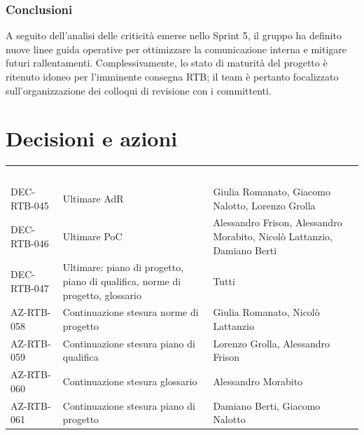 \documentclass[a4paper, 11pt]{article}
\begin{document}
\subsubsection{Conclusioni}
A seguito dell'analisi delle criticità emerse nello Sprint 5, il gruppo ha definito nuove linee guida operative per ottimizzare la comunicazione interna e mitigare futuri rallentamenti. Complessivamente, lo stato di maturità del progetto è ritenuto idoneo per l'imminente consegna RTB; il team è pertanto focalizzato sull'organizzazione dei colloqui di revisione con i committenti.

\section{Decisioni e azioni} \label{DecisioniAzioni}
\begin{center}
    \begin{tabular}{>{\centering\arraybackslash}m{3cm} >{\raggedright\arraybackslash}p{7cm} >{\centering\arraybackslash}p{2.5cm}}
        \rowcolor{AccentColor}
        \textcolor{white}{\textbf{Codice }} & 
        \multicolumn{1}{c}{\textcolor{white}{\textbf{Descrizione}}} & 
        \textcolor{white}{\textbf{Assegnatario}} \\
        
        DEC-RTB-045 & Ultimare AdR & Giulia Romanato, Giacomo Nalotto, Lorenzo Grolla \\
        DEC-RTB-046 & Ultimare PoC & Alessandro Frison, Alessandro Morabito, Nicolò Lattanzio, Damiano Berti \\
        DEC-RTB-047 & Ultimare: piano di progetto, piano di qualifica, norme di progetto, glossario & Tutti \\
        \midrule
        AZ-RTB-058 & Continuazione stesura norme di progetto & Giulia Romanato, Nicolò Lattanzio\\
        AZ-RTB-059 & Continuazione stesura piano di qualifica & Lorenzo Grolla, Alessandro Frison\\
        AZ-RTB-060 & Continuazione stesura glossario & Alessandro Morabito\\
        AZ-RTB-061 & Continuazione stesura piano di progetto & Damiano Berti, Giacomo Nalotto\\
    \end{tabular}
\end{center}
\end{document}
